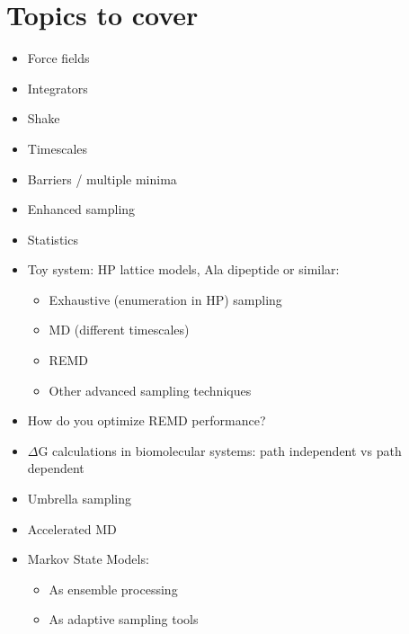 \documentclass{article}
\begin{document}
\section{Topics to cover}
\begin{itemize}
    \item Force fields
    \item Integrators
    \item Shake
    \item Timescales
    \item Barriers / multiple minima
    \item Enhanced sampling
    \item Statistics

    \item Toy system: HP lattice models, Ala dipeptide or similar:
	    \begin{itemize}
	        \item Exhaustive (enumeration in HP) sampling 
	        \item MD (different timescales)
	        \item REMD
	        \item Other advanced sampling techniques
	    \end{itemize}
    \item How do you optimize REMD performance?
    \item $\Delta$G calculations in biomolecular systems: path independent vs path dependent
	\item Umbrella sampling
	\item Accelerated MD
    \item Markov State Models: 
        \begin{itemize} 
            \item As ensemble processing
	        \item As adaptive sampling tools
        \end{itemize}
\end{itemize}
\end{document}

